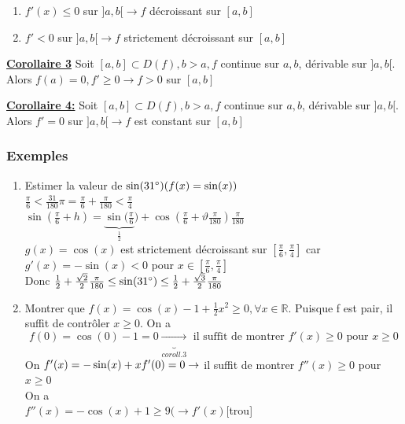 \documentclass[12pt,a4paper]{article}
\newcommand{\evid}[1]{\textbf{\underline{#1}}}
\newcommand{\R}{\ensuremath{\mathbb{R}} }
\newcommand{\pour}{\mbox{ pour }}
\begin{document}
{\begin{boite}
\begin{enumerate}[label=\roman*)]
		\item $f'(x) \leq 0$ sur $]a,b[ \to f$ décroissant sur $[a,b]$
		\item $f' < 0 $ sur $]a,b[\to f$ strictement décroissant sur $[a,b]$
	\end{enumerate}
\end{boite}
\begin{boite}
	\evid{Corollaire 3} Soit $[a,b] \subset D(f), b>a, f$ continue sur ${a,b}$, dérivable sur $]a,b[$. Alors $f(a) = 0, f' \geq 0 \to f > 0$ sur $[a,b]$
\end{boite}
\begin{boite}
	\evid{Corollaire 4:} Soit $[a,b] \subset D(f), b>a, f$ continue sur ${a,b}$, dérivable sur $]a,b[$. Alors $f'=0$ sur $]a,b[ \to f$ est constant sur $[a,b]$
\end{boite}
\subsubsection{Exemples}
\begin{enumerate}[label=\roman*)]
	\item Estimer la valeur de $\sin(31\degree) (f(x) = \sin(x))$\\
		$\frac{\pi}{6} < \frac{31}{180}\pi = \frac{\pi}{6} + \frac{\pi}{180} < \frac{\pi}{4}$\\
		$\sin(\frac{\pi}{6} + h) = \underbrace{\sin(\frac{\pi}{6}}_{\frac{1}{2}}) + \cos(\frac{\pi}{6} + \vartheta \frac{\pi}{180})\frac{\pi}{180}$\\
		$g(x) = \cos(x)$ est strictement décroissant sur $[\frac{\pi}{6}, \frac{\pi}{4}]$ car $g'(x) = -\sin(x) < 0$ pour $x \in [\frac{\pi}{6},\frac{\pi}{4}]$\\
		Donc $\frac{1}{2} + \frac{\sqrt{2}}{2}\frac{\pi}{180} \leq \sin(31\degree) \leq \frac{1}{2} + \frac{\sqrt{3}}{2}\frac{\pi}{180}$ 	
		\item Montrer que $f(x) = \cos(x)-1+\frac{1}{2}x^2 \geq 0,\forall x \in \R
$. Puisque f est pair, il suffit de contrôler $x \geq 0$. On a
\begin{equation}
f(0) = \cos(0)-1 = 0 \underbrace{\to}_{coroll. 3}\mbox{ il suffit de montrer }f'(x) \geq 0 \pour x \geq 0
\end{equation}
On $f'(x) = -\sin(x) + x\\
f'(0) = 0 \to $ il suffit de montrer $f''(x) \geq 0$ pour $x \geq 0$\\
On a\\
$f''(x) = -\cos(x) + 1 \geq 9 (\to f'(x)$[trou]
\end{enumerate}
}
\end{document}
